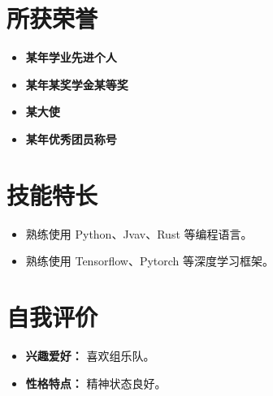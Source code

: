 \documentclass[11pt]{article}
\newlength{\iconwidth}
\begin{document}
    \vspace{1em}

    \begin{minipage}[t]{\textwidth}
        \section[所获荣誉]{\makebox[\iconwidth][c]{\color{primary_color}{\faStar}}\quad 所获荣誉}
        \begin{itemize}
            \item \textbf{某年学业先进个人}
            \item \textbf{某年某奖学金某等奖}
            \item \textbf{某大使}
            \item \textbf{某年优秀团员称号}
        \end{itemize}
    \end{minipage}

    \vspace{1em}
    
    \begin{minipage}[t]{\textwidth}
        \section[技能特长]{\makebox[\iconwidth][c]{\color{primary_color}{\faWrench}}\quad 技能特长}
        \begin{itemize}
        \setlength{\itemsep}{0.5em}
            \item 熟练使用 Python、Jvav、Rust 等编程语言。
            \item 熟练使用 Tensorflow、Pytorch 等深度学习框架。
        \end{itemize}
    \end{minipage}
    
    \vspace{1em}
    
    \begin{minipage}[t]{\textwidth}
        \section[自我评价]{\makebox[\iconwidth][c]{\color{primary_color}{\faStar}}\quad 自我评价}
        \begin{itemize}
            \setlength{\itemsep}{0.5em}
            \item \textbf{兴趣爱好：} 喜欢组乐队。
            \item \textbf{性格特点：} 精神状态良好。
        \end{itemize}
    \end{minipage}
\end{document}
